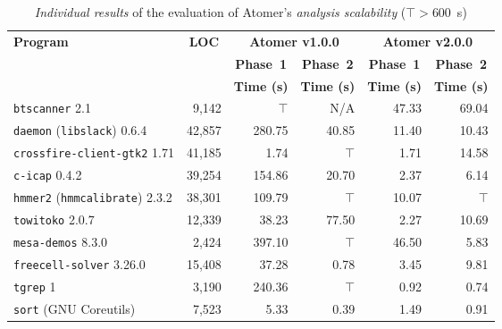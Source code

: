 \begin{table}[hbt]
    \centering
    \small

    \begin{tabular}{|l|r|r|r|r|r|}
        \hline

        \multirow{3}{*}{\textbf{Program}} & \multicolumn{1}{c|}{\multirow{3}{*}{\textbf{LOC}}} & \multicolumn{2}{c|}{\textbf{Atomer v1.0.0}} & \multicolumn{2}{c|}{\textbf{Atomer v2.0.0}} \\ \cline{3-6}

        & & \multicolumn{1}{c|}{\textbf{Phase~1}} & \multicolumn{1}{c|}{\textbf{Phase~2}} & \multicolumn{1}{c|}{\textbf{Phase~1}} & \multicolumn{1}{c|}{\textbf{Phase~2}} \\
        
        & & \multicolumn{1}{c|}{\textbf{Time (s)}} & \multicolumn{1}{c|}{\textbf{Time (s)}} & \multicolumn{1}{c|}{\textbf{Time (s)}} & \multicolumn{1}{c|}{\textbf{Time (s)}} \\ \hline \hline

        \texttt{btscanner} 2.1 & 9,142 & $ \top $ & N/A & 47.33 & 69.04 \\ \hline

        \texttt{daemon} (\texttt{libslack}) 0.6.4 & 42,857 & 280.75 & 40.85 & 11.40 & 10.43 \\ \hline

        \texttt{crossfire-client-gtk2} 1.71 & 41,185 & 1.74 & $ \top $ & 1.71 & 14.58 \\ \hline

        \texttt{c-icap} 0.4.2 & 39,254 & 154.86 & 20.70 & 2.37 & 6.14 \\ \hline

        \texttt{hmmer2} (\texttt{hmmcalibrate}) 2.3.2 & 38,301 & 109.79 & $ \top $ & 10.07 & $ \top $ \\ \hline

        \texttt{towitoko} 2.0.7 & 12,339 & 38.23 & 77.50 & 2.27 & 10.69 \\ \hline

        \texttt{mesa-demos} 8.3.0 & 2,424 & 397.10 & $ \top $ & 46.50 & 5.83 \\ \hline

        \texttt{freecell-solver} 3.26.0 & 15,408 & 37.28 & 0.78 & 3.45 & 9.81 \\ \hline \hline

        \texttt{tgrep} 1 & 3,190 & 240.36 & $ \top $ & 0.92 & 0.74 \\ \hline

        \texttt{sort} (GNU Coreutils) & 7,523 & 5.33 & 0.39 & 1.49 & 0.91 \\ \hline
    \end{tabular}

    \caption{\emph{Individual results} of the evaluation of Atomer's \emph{analysis scalability} ($ \top > 600 $\ \!s)}
    \label{tab:expScal}
\end{table}



